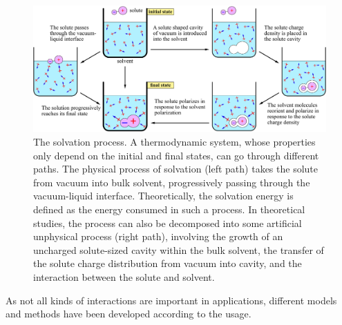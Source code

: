 \begin{figure}[h]
\centering{}\textcolor{red}{}%
\noindent\begin{minipage}[t]{1\textwidth}%
\begin{center}
\includegraphics[width=1\columnwidth]{_figure/solvation}\caption[The solvation process]{The solvation process.\label{fig:Process-of-solvation} A thermodynamic
system, whose properties only depend on the initial and final states,
can go through different paths. The physical process of solvation
(left path) takes the solute from vacuum into bulk solvent, progressively
passing through the vacuum-liquid interface. Theoretically, the solvation
energy is defined as the energy consumed in such a process. In theoretical
studies, the process can also be decomposed into some artificial unphysical
process (right path), involving the growth of an uncharged solute-sized
cavity within the bulk solvent, the transfer of the solute charge
distribution from vacuum into cavity, and the interaction between
the solute and solvent.}
\par\end{center}%
\end{minipage}
\end{figure}

As not all kinds of interactions are important in applications, different
models and methods have been developed according to the usage.

